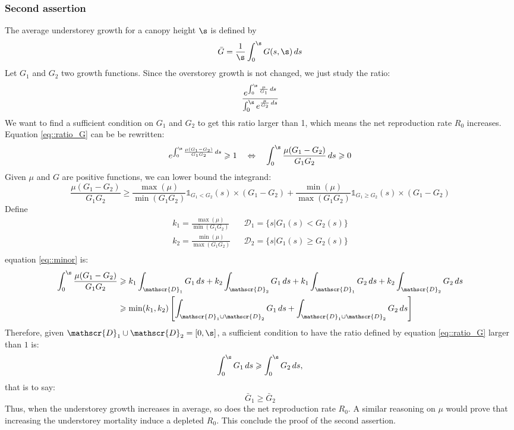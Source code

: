 \begin{refsection}
\subsubsection{Second assertion}
The average understorey growth for a canopy height $ \s $ is defined by
\[
	\bar{G} = \frac{1}{\s} \int_0^{\s} G(s, \s) \, ds
\]
Let $ G_1 $ and $ G_2 $ two growth functions. Since the overstorey growth is not changed, we just study the ratio:
\begin{equation} \label{eq::ratio_G}
	\frac{e^{\int_0^{\s} \frac{\mu}{G_1} \, ds}}{\int_0^{\s}e^{\frac{\mu}{G_2} \, ds}}
\end{equation}
We want to find a sufficient condition on $ G_1 $ and $ G_2 $ to get this ratio larger than 1, which means the net reproduction rate $ R_0 $ increases. Equation \eqref{eq::ratio_G} can be be rewritten:
\[
	e^{\int_0^{\s} \frac{\mu (G_1 - G_2)}{G_1 G_2} \, ds} \geqslant 1 \quad \Leftrightarrow \quad \int_0^{\s} \frac{\mu (G_1 - G_2)}{G_1 G_2} \, ds \geqslant 0
\]
Given $ \mu $ and $ G $ are positive functions, we can lower bound the integrand:
\begin{equation} \label{eq::minor}
	\frac{\mu (G_1 - G_2)}{G_1 G_2} \geqslant \frac{\max(\mu)}{\min(G_1 G_2)} \mathds{1}_{G_1 < G_2} (s) \times (G_1 - G_2) + \frac{\min(\mu)}{\max(G_1 G_2)} \mathds{1}_{G_1 \geqslant G_2}(s) \times (G_1 - G_2)
\end{equation}
Define
\[
	\begin{matrix}
		k_1 = \frac{\max(\mu)}{\min(G_1 G_2)} & &
			\mathscr{D}_1 = \{ s | G_1(s) < G_2(s) \} \\
		k_2 = \frac{\min(\mu)}{\max(G_1 G_2)} & &
		 	\mathscr{D}_2 = \{ s | G_1(s) \geqslant G_2(s) \}\\
	\end{matrix}
\]
equation \eqref{eq::minor} is:
\begin{align*}
	\int_0^{\s} \frac{\mu (G_1 - G_2)}{G_1 G_2} &\geqslant
		k_1 \int_{\mathscr{D}_1} G_1  \, ds + k_2 \int_{\mathscr{D}_2} G_1 \, ds +
		k_1 \int_{\mathscr{D}_1} G_2  \, ds + k_2 \int_{\mathscr{D}_2} G_2 \, ds \\
	&\geqslant \min (k_1, k_2) \left[\int_{\mathscr{D}_1 \cup \mathscr{D}_2} G_1 \, ds + \int_{\mathscr{D}_1 \cup \mathscr{D}_2} G_2 \, ds \right]
\end{align*}
Therefore, given $ \mathscr{D}_1 \cup \mathscr{D}_2 = [0, \s] $, a sufficient condition to have the ratio defined by equation \eqref{eq::ratio_G} larger than $ 1 $ is:
\begin{equation}
	\int_0^{\s} G_1 \, ds \geqslant \int_0^{\s} G_2 \, ds,
\end{equation}
that is to say:
\[
	\bar{G}_1 \geqslant \bar{G}_2
\]
Thus, when the understorey growth increases in average, so does the net reproduction rate $ R_0 $. A similar reasoning on $ \mu $ would prove that increasing the understorey mortality induce a depleted $ R_0 $. This conclude the proof of the second assertion.


\end{refsection}
